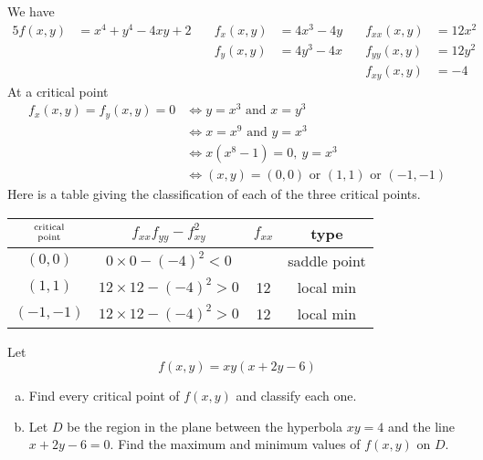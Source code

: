 \begin{solution}
We have
\begin{alignat*}{5}
f(x,y)&=x^4+y^4-4xy+2\quad &
f_x(x,y)&=4x^3-4y\quad &
f_{xx}(x,y)&=12x^2
\\
 & & f_y(x,y)&=4y^3-4x &
f_{yy}(x,y)&=12y^2
\\
 & & & &f_{xy}(x,y)&=-4
\end{alignat*}
At a critical point
\begin{align*}
f_x(x,y)=f_y(x,y)=0
&\iff y=x^3\text{ and }x=y^3 \\
&\iff x=x^9\text{ and }y=x^3 \\
&\iff x(x^8-1)=0,\ y=x^3 \\
&\iff (x,y)=(0,0)\text{ or }(1,1)\text{ or }(-1,-1)
\end{align*}
Here is a table giving the classification of each of the three critical
points.

\begin{center}
\renewcommand{\arraystretch}{1.3}
     \begin{tabular}{|c|c|c|c|}
     \hline
    $\Atop{\text{critical}}{\text{point}}$  & $f_{xx}f_{yy}-f_{xy}^2$ & 
                                                          $f_{xx}$ & type \\    
    \hline
     $(0,0)$   & $0\times 0-(-4)^2<0$   &    & saddle point \\ \hline
     $(1,1)$   & $12\times 12-(-4)^2>0$ & 12 & local min \\  \hline
     $(-1,-1)$ & $12\times 12-(-4)^2>0$ & 12 & local min \\  \hline
     \end{tabular}
\renewcommand{\arraystretch}{1.0}
\end{center}
\end{solution}

\begin{question}[M200 2003A] %
Let
\begin{equation*}
f(x,y)=xy(x+2y-6)
\end{equation*}
\begin{enumerate}[(a)]
\item
 Find every critical point of $f(x,y)$ and classify each one.
\item
 Let $D$ be the region in the plane between the hyperbola
$xy=4$ and the line $x+2y-6=0$. Find the maximum and minimum values of
$f(x,y)$ on $D$.
\end{enumerate}
\end{question}


